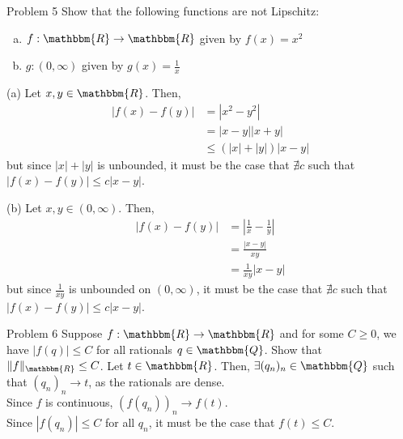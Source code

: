 \documentclass[8pt]{extarticle}
\newcommand{\Q}{\mathbbm{Q}}
\newcommand{\R}{\mathbbm{R}}
\begin{document}
  \begin{problem}{Problem 5}
    Show that the following functions are not Lipschitz:
    \begin{enumerate}[(a)]
      \item $f: \R \rightarrow \R$ given by $f(x) = x^2$
      \item $g: (0,\infty)$ given by $g(x) = \frac{1}{x}$
    \end{enumerate}
    \tcblower
    \begin{problem}{(a)}
      Let $x,y\in \R$. Then,
      \begin{align*}
        \left|f(x) - f(y)\right| &= \left|x^2 - y^2\right|\\
                                 &= |x-y||x+y|\\
                                 &\leq \left(|x| + |y|\right)|x-y|
      \end{align*}
      but since $|x| + |y|$ is unbounded, it must be the case that $\nexists c$ such that $|f(x) - f(y)| \leq c|x-y|$.
    \end{problem}
    \begin{problem}{(b)}
      Let $x,y\in (0,\infty)$. Then,
      \begin{align*}
        |f(x) - f(y)| &= \left|\frac{1}{x} - \frac{1}{y}\right|\\
                      &= \frac{|x-y|}{xy}\\
                      &= \frac{1}{xy}|x-y|
      \end{align*}
      but since $\frac{1}{xy}$ is unbounded on $(0,\infty)$, it must be the case that $\nexists c$ such that $|f(x) - f(y)| \leq c|x-y|$.
    \end{problem}
  \end{problem}
  \begin{problem}{Problem 6}
    Suppose $f: \R \rightarrow \R$ and for some $C \geq 0$, we have $|f(q)| \leq C$ for all rationals $q\in \Q$. Show that $\Vert f \Vert_{\R} \leq C$.
    \tcblower
    Let $t\in \R$. Then, $\exists (q_n)_n \in \Q$ such that $(q_n)_n \rightarrow t$, as the rationals are dense.\\

    Since $f$ is continuous, $\left(f(q_n)\right)_n \rightarrow f(t)$.\\

    Since $|f(q_n)| \leq C$ for all $q_n$, it must be the case that $f(t) \leq C$.
  \end{problem}
\end{document}
